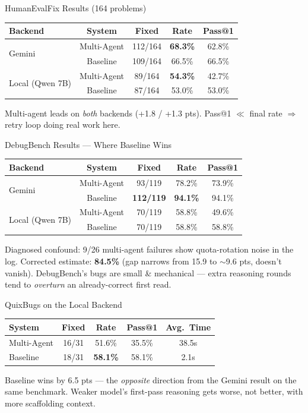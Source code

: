 \documentclass[aspectratio=169]{beamer}
\begin{document}
\begin{frame}{HumanEvalFix Results (164 problems)}
\begin{table}
\centering
\small
\begin{tabular}{lcccc}
\toprule
\textbf{Backend} & \textbf{System} & \textbf{Fixed} & \textbf{Rate} & \textbf{Pass@1} \\
\midrule
\multirow{2}{*}{Gemini} & Multi-Agent & 112/164 & \textbf{68.3\%} & 62.8\% \\
 & Baseline & 109/164 & 66.5\% & 66.5\% \\
\multirow{2}{*}{Local (Qwen 7B)} & Multi-Agent & 89/164 & \textbf{54.3\%} & 42.7\% \\
 & Baseline & 87/164 & 53.0\% & 53.0\% \\
\bottomrule
\end{tabular}
\end{table}
Multi-agent leads on \emph{both} backends (+1.8 / +1.3 pts). Pass@1 $\ll$ final rate $\Rightarrow$ retry loop doing real work here.
\end{frame}

\begin{frame}{DebugBench Results --- Where Baseline Wins}
\begin{table}
\centering
\small
\begin{tabular}{lcccc}
\toprule
\textbf{Backend} & \textbf{System} & \textbf{Fixed} & \textbf{Rate} & \textbf{Pass@1} \\
\midrule
\multirow{2}{*}{Gemini} & Multi-Agent & 93/119 & 78.2\% & 73.9\% \\
 & Baseline & \textbf{112/119} & \textbf{94.1\%} & 94.1\% \\
\multirow{2}{*}{Local (Qwen 7B)} & Multi-Agent & 70/119 & 58.8\% & 49.6\% \\
 & Baseline & 70/119 & 58.8\% & 58.8\% \\
\bottomrule
\end{tabular}
\end{table}
\small
Diagnosed confound: 9/26 multi-agent failures show quota-rotation noise in the log. Corrected estimate: \textbf{84.5\%} (gap narrows from 15.9 to $\sim$9.6 pts, doesn't vanish). DebugBench's bugs are small \& mechanical --- extra reasoning rounds tend to \emph{overturn} an already-correct first read.
\end{frame}

\begin{frame}{QuixBugs on the Local Backend}
\begin{table}
\centering
\begin{tabular}{lcccc}
\toprule
\textbf{System} & \textbf{Fixed} & \textbf{Rate} & \textbf{Pass@1} & \textbf{Avg.\ Time} \\
\midrule
Multi-Agent & 16/31 & 51.6\% & 35.5\% & 38.5s \\
Baseline & 18/31 & \textbf{58.1\%} & 58.1\% & 2.1s \\
\bottomrule
\end{tabular}
\end{table}
Baseline wins by 6.5 pts --- the \emph{opposite} direction from the Gemini result on the same benchmark. Weaker model's first-pass reasoning gets worse, not better, with more scaffolding context.
\end{frame}
\end{document}
